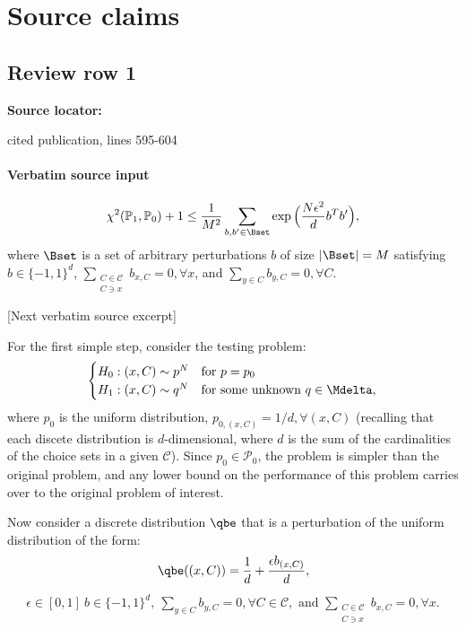 \documentclass[10pt]{article}
\begin{document}
\clearpage
\hypertarget{source-claim-170f4034c89e0c5a}{}
\hypertarget{source-section-f10b5f68e4acf3dc}{}
\section*{Source claims}
\subsection*{Review row 1}
\textbf{Source locator:} {\footnotesize\raggedright cited publication, lines 595-\allowbreak{}604\par}
\paragraph{Verbatim source input}
\begin{ReviewVerbatim}
\begin{lemma}
		\label{lemma:bound1}
		$$
		\chi^2(\mathbb{P}_1,\mathbb{P}_0) + 1
		\le
		\frac{1}{M^2}\sum_{b,b' \in \Bset}\exp\Big(\frac{N \epsilon^2}{d}b^Tb'\Big)
		,
		$$
		where $\Bset$ is a set of arbitrary perturbations $b$ of size $|\Bset|=M$ satisfying $b \in \lbrace -1, 1 \rbrace^d$, $\sum_{\substack{C \in \mathcal{C}\\ C \ni x}} b_{x,C} = 0, \forall x$, and $\sum_{y \in C} b_{y,C} = 0, \forall C$.
	\end{lemma}

[Next verbatim source excerpt]

	For the first simple step, consider the testing problem:
	\begin{align}
	\label{eq:test2}
	\begin{cases}
	H_0: (x, C) \sim p^N & \text{for } p = p_0 \\
	H_1: (x,C) \sim q^N & \text{for some unknown } q \in \Mdelta,
	\end{cases}
	\end{align}
	where $p_0$ is the uniform distribution, $p_{0,(x,C)} = 1/d, \forall (x,C)$ (recalling that each discete distribution is $d$-dimensional, where $d$ is the sum of the cardinalities of the choice sets in a given $\mathcal C$). Since $p_0 \in \mathcal{P}_0$, the problem is simpler than the original problem, and any lower bound on the performance of this problem carries over to the original problem of interest.

	Now consider a discrete distribution $\qbe$ that is a perturbation of the uniform distribution of the form:
	\begin{align*}
	\qbe((x,C)) = \frac{1}{d} + \frac{\epsilon b_{(x,C)}}{d},
	\end{align*}
	\begin{align*}
	\epsilon \in [0,1] \
	b \in \lbrace -1, 1 \rbrace^d,
	\
	\sum_{y \in C} b_{y,C} = 0, \forall C \in \mathcal C,
	\text{ and }
	\sum_{\substack{C \in \mathcal{C}\\ C \ni x}} b_{x,C} = 0, \forall x.
	\end{align*}


\end{ReviewVerbatim}
\end{document}
